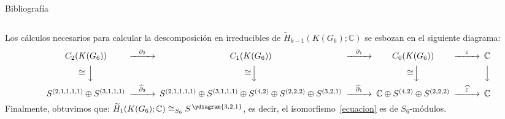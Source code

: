 \documentclass[final,xcolor=svgnames]{beamer}
\begin{document}
\begin{frame}{}
\begin{columns}
\begin{column}{0.5\textwidth}
\begin{block}{Bibliografía}
  
  
\end{block}
\end{column}
\end{columns}

  \vfill

  \begin{block}{}
    Los cálculos necesarios para calcular la descomposición en
    irreducibles de $\widetilde H_{k-1}(K(G_{6});\mathbb{C})$ se esbozan
    en el siguiente diagrama:
    \[
    \begin{CD}
      C_{2}(K(G_{6})) @>{\partial_{2}}>> C_{1}(K(G_{6})) @>{\partial_{1}}>> C_{0}(K(G_{6})) @>{\varepsilon}>> \mathbb{C}\\
      \cong @VVV{\cong}   @VVV{\cong}   @VVV   @VVV    \\
      S^{(2,1,1,1,1)}\oplus S^{(3,1,1,1)} @>{\widehat\partial_{2}}>>
      S^{(2,1,1,1,1)}\oplus S^{(3,1,1,1)}\oplus S^{(4,2)}\oplus S^{(2,2,2)}\oplus S^{(3,2,1)} @>{\widehat\partial_{1}}>> 
      \mathbb{C} \oplus S^{(4,2)}\oplus S^{(2,2,2)} @>{\widehat \varepsilon}>>  \mathbb{C}
    \end{CD}
    \]
    Finalmente, obtuvimos que: $\widetilde
    H_{1}(K(G_{6});\mathbb{C})\cong_{S_{6}}S^{\,\ydiagram{3,2,1}}$, es
    decir, el isomorfismo~\eqref{ecuacion} es de $S_{6}$-módulos.
  \end{block}
\end{frame}
\end{document}
